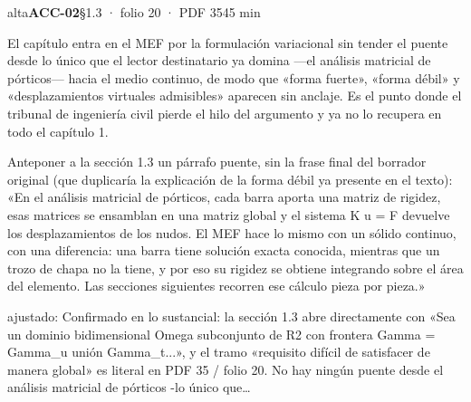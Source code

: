 \begin{ficha}{alta}{\casilla\textbf{ACC-02}\quad{}\quad §1.3 · folio 20 · PDF 35\hfill 45 min}
\par
{}El capítulo entra en el MEF por la formulación variacional sin tender el puente desde lo único que el lector destinatario ya domina —el análisis matricial de pórticos— hacia el medio continuo, de modo que «forma fuerte», «forma débil» y «desplazamientos virtuales admisibles» aparecen sin anclaje. Es el punto donde el tribunal de ingeniería civil pierde el hilo del argumento y ya no lo recupera en todo el capítulo 1.\par
{}Anteponer a la sección 1.3 un párrafo puente, sin la frase final del borrador original (que duplicaría la explicación de la forma débil ya presente en el texto): «En el análisis matricial de pórticos, cada barra aporta una matriz de rigidez, esas matrices se ensamblan en una matriz global y el sistema K u = F devuelve los desplazamientos de los nudos. El MEF hace lo mismo con un sólido continuo, con una diferencia: una barra tiene solución exacta conocida, mientras que un trozo de chapa no la tiene, y por eso su rigidez se obtiene integrando sobre el área del elemento. Las secciones siguientes recorren ese cálculo pieza por pieza.»\par
{\footnotesize\color{gris}ajustado: Confirmado en lo sustancial: la sección 1.3 abre directamente con «Sea un dominio bidimensional Omega subconjunto de R2 con frontera Gamma = Gamma\_\allowbreak{}u unión Gamma\_\allowbreak{}t...», y el tramo «requisito difícil de satisfacer de manera global» es literal en PDF 35 /\allowbreak{} folio 20. No hay ningún puente desde el análisis matricial de pórticos -lo único que…\par}
\end{ficha}

